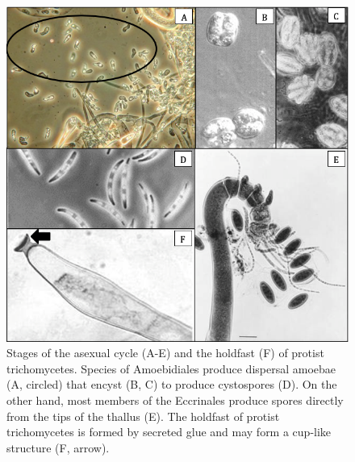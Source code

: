 \documentclass[]{book}
\begin{document}
\begin{figure}

{\centering \includegraphics[width=8.72in]{img/Ch4_Fig4} 

}

\caption{Stages of the asexual cycle (A-E) and the holdfast (F) of protist trichomycetes.  Species of Amoebidiales produce dispersal amoebae (A, circled) that encyst (B, C) to produce cystospores (D).  On the other hand, most members of the Eccrinales produce spores directly from the tips of the thallus (E).  The holdfast of protist trichomycetes is formed by secreted glue and may form a cup-like structure (F, arrow).}\label{fig:ch4fig4}
\end{figure}
\end{document}
